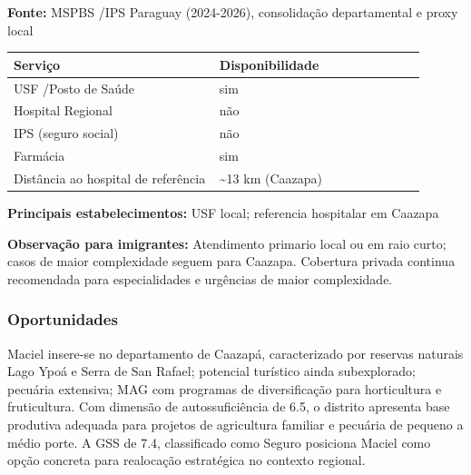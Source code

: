 \textbf{Fonte:} MSPBS /\allowbreak  IPS Paraguay (2024-2026), consolidação
departamental e proxy local

{\def\LTcaptype{none} %
\begin{longtable}{@{}>{\raggedright\arraybackslash}p{0.45\linewidth} >{\raggedright\arraybackslash}p{0.45\linewidth}@{}}
\toprule\noalign{}
Serviço & Disponibilidade \\
\midrule\noalign{}
\endhead
\bottomrule\noalign{}
\endlastfoot
USF /\allowbreak  Posto de Saúde & sim \\
Hospital Regional & não \\
IPS (seguro social) & não \\
Farmácia & sim \\
Distância ao hospital de referência & \textasciitilde13 km (Caazapa) \\
\end{longtable}
}

\textbf{Principais estabelecimentos:} USF local; referencia hospitalar
em Caazapa

\textbf{Observação para imigrantes:} Atendimento primario local ou em
raio curto; casos de maior complexidade seguem para Caazapa. Cobertura
privada continua recomendada para especialidades e urgências de maior
complexidade.
\newpage

\subsubsection*{Oportunidades}\label{oport-maciel-0606}
Maciel insere-se no departamento de Caazapá, caracterizado por reservas naturais Lago Ypoá e Serra de San Rafael; potencial turístico ainda subexplorado; pecuária extensiva; MAG com programas de diversificação para horticultura e fruticultura. Com dimensão de autossuficiência de 6.5, o distrito apresenta base produtiva adequada para projetos de agricultura familiar e pecuária de pequeno a médio porte. A GSS de 7.4, classificado como Seguro posiciona Maciel como opção concreta para realocação estratégica no contexto regional.

